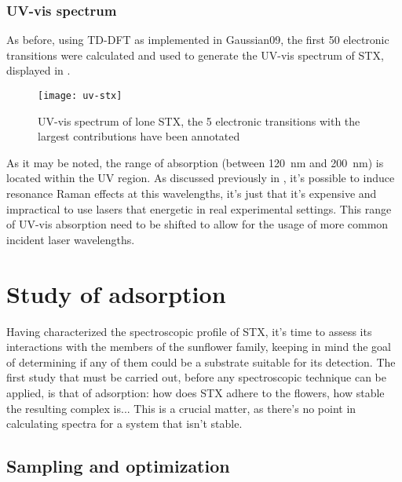 \subsubsection{UV-vis spectrum}
As before, using TD-DFT as implemented in Gaussian09, the first 50 electronic transitions were calculated and used to generate the UV-vis spectrum of STX, displayed in .

\begin{figure}
    \texttt{[image: uv-stx]}
    \caption[UV-vis spectrum of lone STX]{UV-vis spectrum of lone STX, the 5 electronic transitions with the largest contributions have been annotated}
\end{figure}

As it may be noted, the range of absorption (between \SI{120}{\nano\metre} and \SI{200}{\nano\metre}) is located within the UV region.
As discussed previously in , it's possible to induce resonance Raman effects at this wavelengths, it's just that it's expensive and impractical to use lasers that energetic in real experimental settings.
This range of UV-vis absorption need to be shifted to allow for the usage of more common incident laser wavelengths.

\section{Study of adsorption}

Having characterized the spectroscopic profile of STX, it's time to assess its interactions with the members of the sunflower family, keeping in mind the goal of determining if any of them could be a substrate suitable for its detection.
The first study that must be carried out, before any spectroscopic technique can be applied, is that of adsorption: how does STX adhere to the flowers, how stable the resulting complex is...
This is a crucial matter, as there's no point in calculating spectra for a system that isn't stable.

\subsection{Sampling and optimization}

